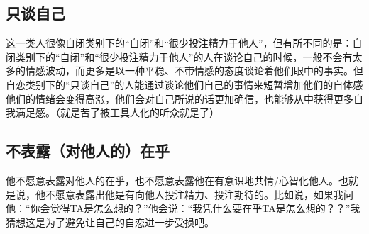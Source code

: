 \subsection*{只谈自己}

这一类人很像自闭类别下的“自闭”和“很少投注精力于他人”，但有所不同的是：自闭类别下的“自闭”和“很少投注精力于他人”的人在谈论自己的时候，一般不会有太多的情感波动，而更多是以一种平稳、不带情感的态度谈论着他们眼中的事实。但自恋类别下的“只谈自己”的人能通过谈论他们自己的事情来短暂增加他们的自体感\pozhehao{}他们的情绪会变得高涨，他们会对自己所说的话更加确信，也能够从中获得更多自我满足感。（就是苦了被工具人化的听众就是了）

\subsection*{不表露（对他人的）在乎}

他不愿意表露对他人的在乎，也不愿意表露他在有意识地共情/心智化他人。也就是说，他不愿意表露出他是有向他人投注精力、投注期待的。比如说，如果我问他：“你会觉得TA是怎么想的？”他会说：“我凭什么要在乎TA是怎么想的？？”我猜想这是为了避免让自己的自恋进一步受损吧。

